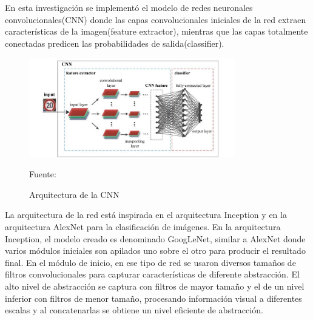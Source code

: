 	En esta investigación se implementó el modelo de redes neuronales convolucionales(CNN) donde las capas convolucionales iniciales de la red extraen características de la imagen(feature extractor), mientras que las capas totalmente conectadas predicen las probabilidades de salida(classifier).

	\begin{figure}[H]
		\begin{center}
		\includegraphics[width=0.8\textwidth]{images/desarrollo/networkArquitec/tempGeneralCNNmodel}
		\end{center}
		\begin{center}
		\caption{\small{Arquitectura de la CNN}}
		{\small{Fuente: \cite{ExtremeLearning}}}
		\end{center}
		\vspace{-1.5em}
	\end{figure}
	
	La arquitectura de la red está inspirada en el arquitectura Inception \citep{Inception} y en la arquitectura AlexNet \citep{Krizhevsky2012} para la clasificación de imágenes. En la arquitectura Inception, el modelo creado es denominado GoogLeNet, similar a AlexNet donde varios módulos iniciales son apilados uno sobre el otro para producir el resultado final. En el módulo de inicio, en ese tipo de red se usaron diversos tamaños de filtros convolucionales para capturar características de diferente abstracción. El alto nivel de abstracción se captura con filtros de mayor tamaño y el de un nivel inferior con filtros de menor tamaño, procesando información visual a diferentes escalas y al concatenarlas se obtiene un nivel eficiente de abstracción. 

